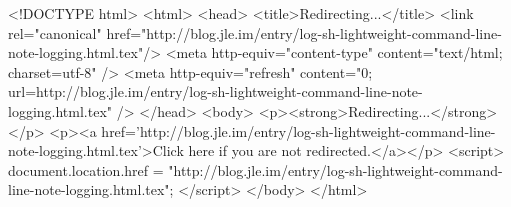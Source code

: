 <!DOCTYPE html>
<html>
<head>
<title>Redirecting...</title>
<link rel="canonical" href="http://blog.jle.im/entry/log-sh-lightweight-command-line-note-logging.html.tex"/>
<meta http-equiv="content-type" content="text/html; charset=utf-8" />
<meta http-equiv="refresh" content="0; url=http://blog.jle.im/entry/log-sh-lightweight-command-line-note-logging.html.tex" />
</head>
<body>
  <p><strong>Redirecting...</strong></p>
  <p><a href='http://blog.jle.im/entry/log-sh-lightweight-command-line-note-logging.html.tex'>Click here if you are not redirected.</a></p>
  <script>
    document.location.href = "http://blog.jle.im/entry/log-sh-lightweight-command-line-note-logging.html.tex";
  </script>
</body>
</html>
